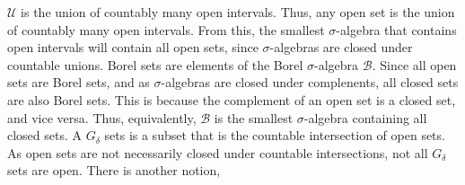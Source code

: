     $\mathcal{U}$ is the union of countably many open
    intervals. Thus, any open set is the union of countably
    many open intervals. From this, the smallest
    $\sigma$-algebra that contains open intervals will contain
    all open sets, since $\sigma$-algebras are closed under
    countable unions. Borel sets are elements of the
    Borel $\sigma$-algebra $\mathcal{B}$. Since all open
    sets are Borel sets, and as $\sigma$-algebras are closed
    under complenents, all closed sets are also Borel sets.
    This is because the complement of an open set is a closed
    set, and vice versa. Thus, equivalently, $\mathcal{B}$ is
    the smallest $\sigma$-algebra containing all closed sets.
    A $G_{\delta}$ sets is a subset that is the countable
    intersection of open sets. As open sets are not
    necessarily closed under countable intersections, not
    all $G_{\delta}$ sets are open. There is another notion,